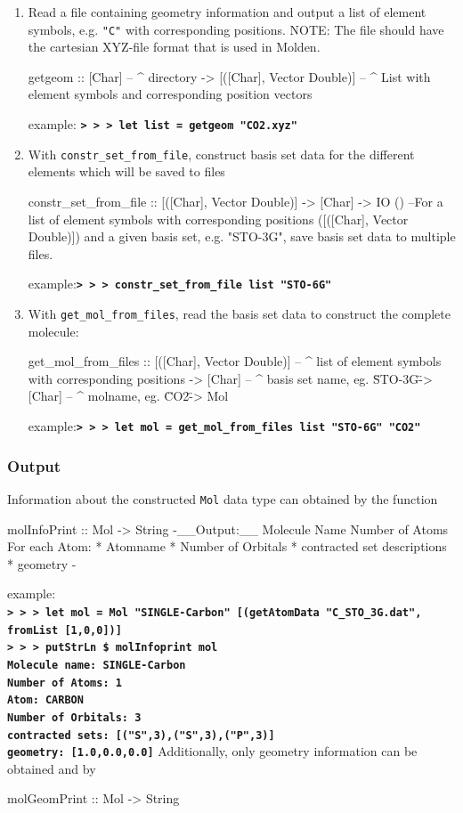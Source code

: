 \documentclass[twoside,        %
			   11pt,			%
               BCOR10mm,       %
               ngerman,english  %
               ]{scrartcl}
\begin{document}
\begin{enumerate}
\item Read a file containing geometry information and output a list of element symbols, e.g. \texttt{"C"} with corresponding positions.
NOTE: The file should have the cartesian XYZ-file format that is used in Molden.
\begin{code}
getgeom :: [Char] -- ^ directory
	-> [([Char], Vector Double)] -- ^ List with element symbols and corresponding position vectors
\end{code}
example:
\textbf{\texttt{> > > let list = getgeom "CO2.xyz"}}
\item With \texttt{constr\_set\_from\_file}, construct basis set data for the different elements which will be saved to files
\begin{code}
constr_set_from_file :: [([Char], Vector Double)] -> [Char] -> IO ()
--For a list of element symbols with corresponding positions ([([Char], Vector Double)]) and a given basis set, e.g. "STO-3G", save basis set data to multiple files.
\end{code}
example:\textbf{\texttt{> > > constr\_set\_from\_file list "STO-6G"}}
\item With \texttt{get\_mol\_from\_files}, read the basis set data to construct the complete molecule:
\begin{code}
get_mol_from_files :: [([Char], Vector Double)] -- ^ list of element symbols with corresponding positions
		-> [Char] -- ^ basis set name, eg. \"STO-3G\"
		-> [Char] -- ^ molname, eg. \"CO2\"
		-> Mol
\end{code}
example:\textbf{\texttt{> > > let mol = get\_mol\_from\_files list "STO-6G" "CO2"}}
\end{enumerate}

\subsubsection{Output}
Information about the constructed \texttt{Mol} data type can obtained by the function
\begin{code}
molInfoPrint :: Mol -> String
{-__Output:__ 
	Molecule Name
	Number of Atoms
	For each Atom:
		* Atomname
		* Number of Orbitals
		* contracted set descriptions
		* geometry
-}
\end{code}
example:\\
\textbf{\texttt{> > > let mol = Mol "SINGLE-Carbon" [(getAtomData "C\_STO\_3G.dat", fromList [1,0,0])]
}}\\
\textbf{\texttt{> > > putStrLn \$ molInfoprint mol
}} \\
\textbf{\texttt{Molecule name:   SINGLE-Carbon}}\\
\textbf{\texttt{Number of Atoms:  1}}\\
\quad \textbf{\texttt{Atom:    CARBON}}\\
\quad \textbf{\texttt{Number of Orbitals:	3}}\\
\quad \quad \textbf{\texttt{contracted sets:	[("S",3),("S",3),("P",3)]}}\\
\quad \quad \textbf{\texttt{geometry:	 	[1.0,0.0,0.0]}}
Additionally, only geometry information can be obtained and by
\begin{code}
molGeomPrint :: Mol -> String
\end{code}
\end{document}
